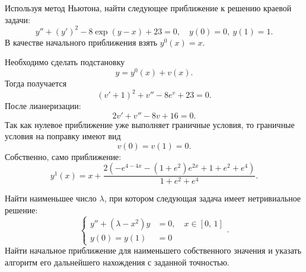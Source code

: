 \documentclass[a4paper]{article}
\begin{document}
\begin{hiProb}[8.2в]
Используя метод Ньютона, найти следующее приближение
к решению краевой задачи:
\[
	y''+(y')^2-8 \exp (y-x) +23=0,\quad
	y(0)=0,\ y(1)=1
.\] 
В качестве начального приближения взять $y^0(x)=x$.
\end{hiProb}
\begin{sol}
Необходимо сделать подстановку
\[
	y=y^0(x)+v(x)
.\] 
Тогда получается
\[
\left(v'+1\right)^2+v''-8 e^{v}+23=0
.\] 
После лианеризации:
\[
2 v'+v''-8 v+16=0
.\] 
Так как нулевое приближение уже выполняет граничные
условия, то граничные условия на поправку имеют вид
\[
	v(0)=v(1)=0
.\] 
Собственно, само приближение:
\[
	y^1(x)=x+ \frac{2 \left(-e^{4-4 x}-\left(1+e^2\right) e^{2 x}+1+e^2+e^4\right)}{1+e^2+e^4}
.\] 
\end{sol}
\begin{hiProb}[8.3$^*$]
Найти наименьшее число $\lambda$, при котором
следующая задача имеет нетривиальное решение:
\[
\left\{
\begin{aligned}
	y''+(\lambda-x^2)y&= 0,\quad x \in [0,\,1] \\
	y(0)=y(1)&=0
\end{aligned}
\right.
.\] 
Найти начальное приближение для наименьшего собственного
значения и указать алгоритм его дальнейшего нахождения
с заданной точностью.
\end{hiProb}
\end{document}
